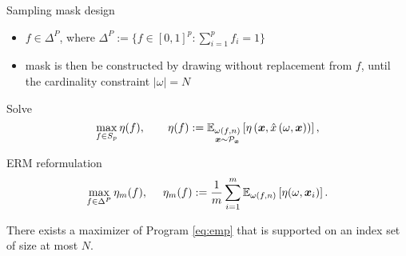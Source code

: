 \begin{frame}{Sampling mask design}

    \begin{itemize}
    \item $f \in \Delta^P$, where $\Delta^P := \{f \in [0,1]^p : \sum_{i=1}^p f_i =1\}$ 
    \item mask is then be constructed by drawing without replacement from $f$, until the cardinality constraint $|\omega|=N$
    \end{itemize}
    
    Solve
    \begin{equation}
    \max_{f\in S_{p}} \eta(f), %
    \qquad \eta(f) :=  \mathbb{E}_{\substack{\omega(f,n)\\ \vx \sim \mathcal{P}_{\vx}}}\left[\eta\left(\vx, \*{\hat{x}}\left(\omega,\vx\right)\right)\right],
    \label{eq:main}
    \end{equation}
    \end{frame}
    
    \begin{frame}
    ERM reformulation
    \begin{equation}
    \label{eq:emp}
    \max_{f\in \Delta^P}  \eta_m(f), \text{~~~~} \eta_m(f) :=\frac{1}{m} \sum_{i=1}^m \mathbb{E}_{\omega(f,n)}\left[\eta(\omega,{\bm{x}}_i)\right].
     \end{equation} 
    
    
    \begin{proposition}
    There exists a maximizer of Program \ref{eq:emp} that is supported on an index set of size at most $N$.\label{prop:1}
    \end{proposition}
    \end{frame}
    
